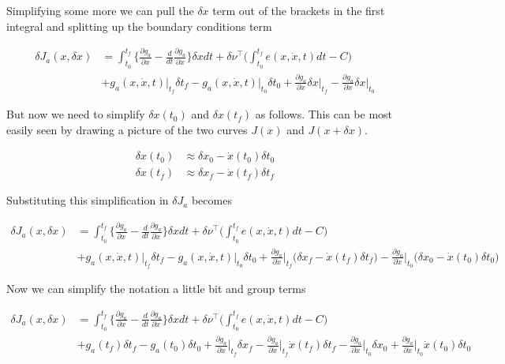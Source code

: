 \documentclass[11pt,letterpaper,onecolumn,notitlepage]{article}
\begin{document}
Simplifying some more we can pull the $\delta x$ term out of the brackets in the first integral and splitting up the boundary conditions term

\begin{align*}
  \delta J_{a}(x,\delta x)&=
  \int_{t_{0}}^{t_{f}}\biggr\{\frac{\partial{}g_{a}}{\partial{}x}-\frac{d}{dt}\frac{\partial{}g_{a}}{\partial\dot{x}}\biggr\}\delta xdt
  +\delta\nu^{\top}\biggr(\int_{t_{0}}^{t_{f}}e(x,\dot{x},t)dt-C\biggr) \\
  &+g_{a}(x,\dot{x},t)\biggr|_{t_{f}}\delta t_{f}
  -g_{a}(x,\dot{x},t)\biggr|_{t_{0}}\delta t_{0}
  +\frac{\partial{}g_{a}}{\partial\dot{x}}\delta x\biggr|_{t_{f}}
  -\frac{\partial{}g_{a}}{\partial\dot{x}}\delta x\biggr|_{t_{0}}
\end{align*}

But now we need to simplify $\delta x(t_{0})$ and $\delta x(t_{f})$ as follows.
This can be most easily seen by drawing a picture of the two curves $J(x)$ and $J(x+\delta x)$.

\begin{align*}
  \delta x(t_{0})&\approx\delta x_{0}-\dot{x}(t_{0})\delta t_{0} \\
  \delta x(t_{f})&\approx\delta x_{f}-\dot{x}(t_{f})\delta t_{f}
\end{align*}

Substituting this simplification in $\delta J_{a}$ becomes

\begin{align*}
  \delta J_{a}(x,\delta x)&=
  \int_{t_{0}}^{t_{f}}\biggr\{\frac{\partial{}g_{a}}{\partial{}x}-\frac{d}{dt}\frac{\partial{}g_{a}}{\partial\dot{x}}\biggr\}\delta xdt
  +\delta\nu^{\top}\biggr(\int_{t_{0}}^{t_{f}}e(x,\dot{x},t)dt-C\biggr) \\
  &+g_{a}(x,\dot{x},t)\biggr|_{t_{f}}\delta t_{f}
  -g_{a}(x,\dot{x},t)\biggr|_{t_{0}}\delta t_{0}
  +\frac{\partial{}g_{a}}{\partial\dot{x}}\biggr|_{t_{f}}\biggr(\delta x_{f}-\dot{x}(t_{f})\delta t_{f}\biggr)
  -\frac{\partial{}g_{a}}{\partial\dot{x}}\biggr|_{t_{0}}\biggr(\delta x_{0}-\dot{x}(t_{0})\delta t_{0}\biggr)
\end{align*}

Now we can simplify the notation a little bit and group terms

\begin{align*}
  \delta J_{a}(x,\delta x)&=
  \int_{t_{0}}^{t_{f}}\biggr\{\frac{\partial{}g_{a}}{\partial{}x}-\frac{d}{dt}\frac{\partial{}g_{a}}{\partial\dot{x}}\biggr\}\delta xdt
  +\delta\nu^{\top}\biggr(\int_{t_{0}}^{t_{f}}e(x,\dot{x},t)dt-C\biggr) \\
  &+g_{a}(t_{f})\delta t_{f}
  -g_{a}(t_{0})\delta t_{0}
  +\frac{\partial{}g_{a}}{\partial\dot{x}}\biggr|_{t_{f}}\delta x_{f}
  -\frac{\partial{}g_{a}}{\partial\dot{x}}\biggr|_{t_{f}}\dot{x}(t_{f})\delta t_{f}
  -\frac{\partial{}g_{a}}{\partial\dot{x}}\biggr|_{t_{0}}\delta x_{0}
  +\frac{\partial{}g_{a}}{\partial\dot{x}}\biggr|_{t_{0}}\dot{x}(t_{0})\delta t_{0}
\end{align*}
\end{document}

